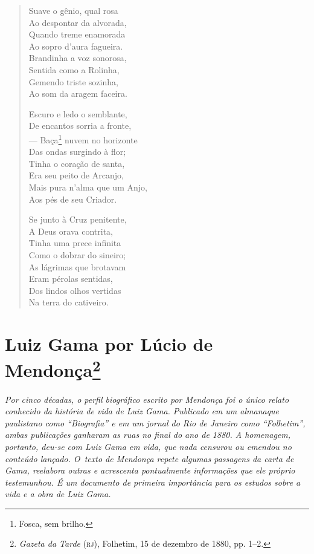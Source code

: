 \begin{verse}
Suave o gênio, qual rosa\\
Ao despontar da alvorada,\\
Quando treme enamorada\\
Ao sopro d'aura fagueira.\\
Brandinha a voz sonorosa,\\
Sentida como a Rolinha,\\
Gemendo triste sozinha,\\
Ao som da aragem faceira.

Escuro e ledo o semblante,\\
De encantos sorria a fronte,\\
--- Baça\footnote{Fosca, sem brilho.} nuvem no horizonte\\
Das ondas surgindo à flor;\\
Tinha o coração de santa,\\
Era seu peito de Arcanjo,\\
Mais pura n'alma que um Anjo,\\
Aos pés de seu Criador.

Se junto à Cruz penitente,\\
A Deus orava contrita,\\
Tinha uma prece infinita\\
Como o dobrar do sineiro;\\
As lágrimas que brotavam\\
Eram pérolas sentidas,\\
Dos lindos olhos vertidas\\
Na terra do cativeiro.
\end{verse}


\chapter{Luiz Gama por Lúcio de Mendonça\footnote{
\emph{Gazeta da Tarde} (\textsc{rj}), Folhetim, 15 de dezembro de 1880, pp. 1--2.}}

\begin{resumo}
\emph{Por cinco décadas, o perfil biográfico escrito por Mendonça foi o
único relato conhecido da história de vida de Luiz Gama. Publicado em um
almanaque paulistano como ``Biografia'' e em um jornal do Rio de Janeiro
como ``Folhetim'', ambas publicações ganharam as ruas no final do ano de
1880. A homenagem, portanto, deu-se com Luiz Gama em vida, que nada
censurou ou emendou no conteúdo lançado. O~texto de Mendonça repete
algumas passagens da carta de Gama, reelabora outras e acrescenta
pontualmente informações que ele próprio testemunhou. É um documento de
primeira importância para os estudos sobre a vida e a obra de Luiz Gama.
}
\end{resumo}

